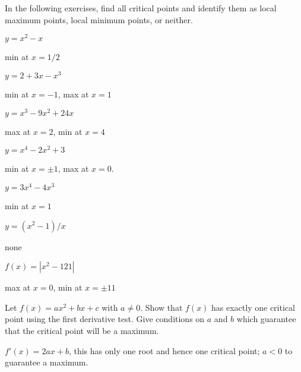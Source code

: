 \begin{exercises}
\noindent In the following exercises, find all critical points and
identify them as local maximum points, local minimum points, or
neither.

\twocol

\begin{exercise} $y=x^2-x$ 
\begin{answer} min at $x=1/2$
\end{answer}\end{exercise}

\begin{exercise} $y=2+3x-x^3$ 
\begin{answer} min at $x=-1$, max at $x=1$
\end{answer}\end{exercise}

\begin{exercise} $y=x^3-9x^2+24x$
\begin{answer} max at $x=2$, min at $x=4$
\end{answer}\end{exercise}

\begin{exercise} $y=x^4-2x^2+3$ 
\begin{answer} min at $x=\pm 1$, max at $x=0$.
\end{answer}\end{exercise}

\begin{exercise} $y=3x^4-4x^3$
\begin{answer} min at $x=1$
\end{answer}\end{exercise}

\begin{exercise} $y=(x^2-1)/x$
\begin{answer} none
\end{answer}\end{exercise}

\begin{exercise} $f(x) = |x^2 - 121|$
\begin{answer} max at $x=0$, min at $x=\pm 11$
\end{answer}\end{exercise}

\endtwocol

\begin{exercise} Let $f(x) =a x^2 + bx + c$ with $a\neq 0$. Show that $f(x)$
has exactly one critical point using the first derivative test. Give
conditions on $a$ and $b$ which guarantee that the critical point will
be a maximum. 
\begin{answer} $f'(x) = 2ax + b$, this has only one root and hence one critical point; $a<0$ to guarantee a maximum.
\end{answer}
\end{exercise}
\end{exercises}











